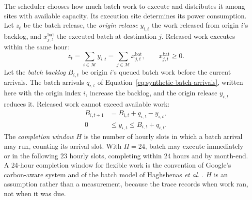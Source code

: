 \documentclass{UNCC-thesis}
\begin{document}
The scheduler chooses how much batch work to execute and distributes it
among sites with available capacity. Its execution site determines its
power consumption. Let \(z_t\) be the batch release, the \emph{origin
release} \(y_{i,t}\) the work released from origin \(i\)'s backlog, and
\(x^{\mathrm{bat}}_{j,t}\) the executed batch at destination \(j\). Released
work executes within the same hour:
\begin{equation}
  z_t
  =
  \sum_{i\in\mathcal M}y_{i,t}
  =
  \sum_{j\in\mathcal M}x^{\mathrm{bat}}_{j,t},
  \qquad
  x^{\mathrm{bat}}_{j,t}\geq0.
  \label{eq:batch-total}
\end{equation}
Let the \emph{batch backlog} \(B_{i,t}\) be origin \(i\)'s queued batch work
before the current arrivals. The batch arrivals \(q_{i,t}\) of
Equation~\eqref{eq:synthetic-batch-arrivals}, written here with the origin
index \(i\), increase the backlog, and the origin release \(y_{i,t}\) reduces
it. Released work cannot exceed available work:
\begin{align}
  B_{i,t+1}
  &=
  B_{i,t}+q_{i,t}-y_{i,t},
  \label{eq:queue-balance}\\
  0
  &\leq y_{i,t}\leq B_{i,t}+q_{i,t}.
  \label{eq:queue-availability}
\end{align}
The \emph{completion window} \(H\) is the number of hourly slots in which a
batch arrival may run, counting its arrival slot. With \(H=24\), batch may
execute immediately or in the following 23 hourly slots, completing within
24 hours and by month-end. A 24-hour completion
window for flexible work is the convention of Google's carbon-aware system
\cite{radovanovic2021carbonaware} and of the batch model of Haghshenas
\emph{et al.} \cite{haghshenas2022infrastructure}. \(H\) is an assumption
rather than a measurement, because the trace records when work ran, not when
it was due.
\end{document}
